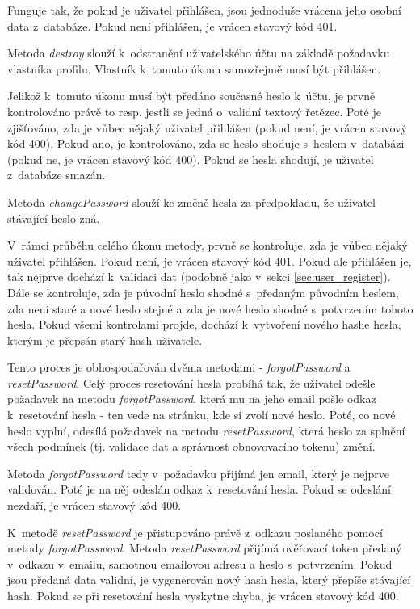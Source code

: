 			Funguje tak, že pokud je uživatel přihlášen, jsou jednoduše vrácena jeho osobní data z~databáze. Pokud není přihlášen, je vrácen stavový kód 401.
			
			\label{sec:user_destroy}
			Metoda \textit{destroy} slouží k~odstranění uživatelského účtu na základě požadavku vlastníka profilu. Vlastník k~tomuto úkonu samozřejmě musí být přihlášen.
			
			Jelikož k~tomuto úkonu musí být předáno současné heslo k~účtu, je prvně kontrolováno právě to resp. jestli se jedná o~validní textový řetězec. Poté je zjišťováno, zda je vůbec nějaký uživatel přihlášen (pokud není, je vrácen stavový kód 400). Pokud ano, je kontrolováno, zda se heslo shoduje s~heslem v~databázi (pokud ne, je vrácen stavový kód 400). Pokud se hesla shodují, je uživatel z~databáze smazán.
			
			\label{sec:user_changepassword}
			Metoda \textit{changePassword} slouží ke změně hesla za předpokladu, že uživatel stávající heslo zná.
			
			V~rámci průběhu celého úkonu metody, prvně se kontroluje, zda je vůbec nějaký uživatel přihlášen. Pokud není, je vrácen stavový kód 401. Pokud ale přihlášen je, tak nejprve dochází k~validaci dat (podobně jako v~sekci \ref{sec:user_register}). Dále se kontroluje, zda je původní heslo shodné s~předaným původním heslem, zda není staré a nové heslo stejné a zda je nové heslo shodné s~potvrzením tohoto hesla. Pokud všemi kontrolami projde, dochází k~vytvoření nového hashe hesla, kterým je přepsán starý hash uživatele.
			
			 \label{sec:user_reset_forgot_password}
			Tento proces je obhospodařován dvěma metodami - \textit{forgotPassword} a \textit{resetPassword}. Celý proces resetování hesla probíhá tak, že uživatel odešle požadavek na metodu \textit{forgotPassword}, která mu na jeho email pošle odkaz k~resetování hesla - ten vede na stránku, kde si zvolí nové heslo. Poté, co nové heslo vyplní, odesílá požadavek na metodu \textit{resetPassword}, která heslo za splnění všech podmínek (tj. validace dat a správnost obnovovacího tokenu) změní. 
			
			Metoda \textit{forgotPassword} tedy v~požadavku přijímá jen email, který je nejprve validován. Poté je na něj odeslán odkaz k~resetování hesla. Pokud se odeslání nezdaří, je vrácen stavový kód 400.
			
			K~metodě \textit{resetPassword} je přistupováno právě z~odkazu poslaného pomocí metody \textit{forgotPassword}. Metoda \textit{resetPassword} přijímá ověřovací token předaný v~odkazu v~emailu, samotnou emailovou adresu a heslo s~potvrzením. Pokud jsou předaná data validní, je vygenerován nový hash hesla, který přepíše stávající hash. Pokud se při resetování hesla vyskytne chyba, je vrácen stavový kód 400.
			

